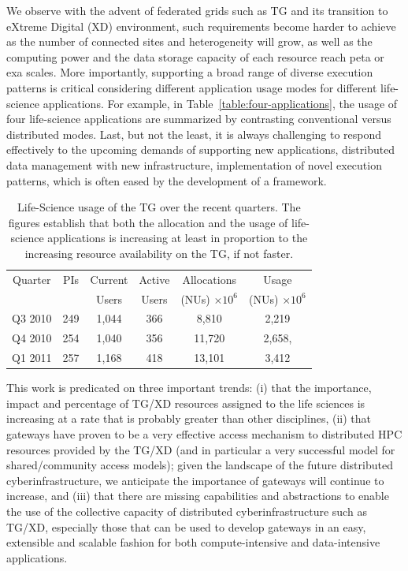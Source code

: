 \documentclass{sig-alternate}
\begin{document}

We observe with the advent of federated grids such as TG and its
transition to eXtreme Digital (XD) environment, such requirements
become harder to achieve as the number of connected sites and
heterogeneity will grow, as well as the computing power and the data
storage capacity of each resource reach peta or exa scales.  More
importantly, supporting a broad range of diverse execution patterns is
critical considering different application usage modes for different
life-science applications.  For example, in
Table~\ref{table:four-applications}, the usage of four life-science
applications are summarized by contrasting conventional versus
distributed modes.  Last, but not the least, it is always challenging
to respond effectively to the upcoming demands of supporting new
applications, distributed data management with new infrastructure,
implementation of novel execution patterns, which is often eased by
the development of a framework.


\begin{table}
 \small
\begin{tabular}{|c|c|c|c|c|c|} 
  \hline  Quarter & PIs & Current & Active & Allocations  & Usage\\
  & & Users  &  Users & (NUs) $\times 10^6$& (NUs) $\times 10^6$ \\ \hline
  Q3 2010 & 249 & 1,044 & 366 & 8,810   & 2,219  \\ \hline
  Q4 2010 & 254 & 1,040 & 356 & 11,720  & 2,658, \\ \hline
  Q1 2011 & 257 & 1,168 & 418 & 13,101  & 3,412\\ \hline 
\end{tabular} 
\caption{Life-Science usage of the TG over the recent
  quarters. The figures establish that both the  allocation and the
  usage of life-science applications is increasing at least in
  proportion to the increasing resource availability on the TG,
  if not faster.}
 \label{tg2011} 
\end{table}

This work is predicated on three important trends: (i) that the
importance, impact and percentage of TG/XD resources assigned to the
life sciences is increasing at a rate that is probably greater than
other disciplines, (ii) that gateways have proven to be a very
effective access mechanism to distributed HPC resources provided by
the TG/XD (and in particular a very successful model for
shared/community access models); given the landscape of the future
distributed cyberinfrastructure, we anticipate the importance of
gateways will continue to increase, and (iii) that there are missing
capabilities and abstractions to enable the use of the collective
capacity of distributed cyberinfrastructure such as TG/XD, especially
those that can be used to develop gateways in an easy, extensible and
scalable fashion for both compute-intensive and data-intensive
applications.
\end{document}

